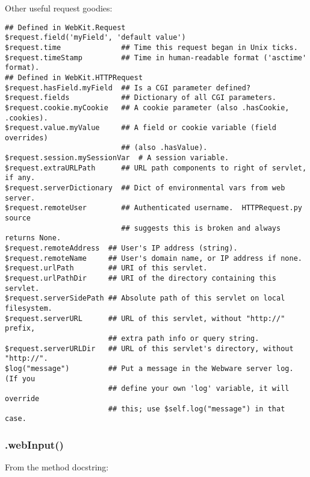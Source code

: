Other useful request goodies:
\begin{verbatim}
## Defined in WebKit.Request
$request.field('myField', 'default value')
$request.time              ## Time this request began in Unix ticks.
$request.timeStamp         ## Time in human-readable format ('asctime' format).
## Defined in WebKit.HTTPRequest
$request.hasField.myField  ## Is a CGI parameter defined?
$request.fields            ## Dictionary of all CGI parameters.
$request.cookie.myCookie   ## A cookie parameter (also .hasCookie, .cookies).
$request.value.myValue     ## A field or cookie variable (field overrides)
                           ## (also .hasValue).
$request.session.mySessionVar  # A session variable.
$request.extraURLPath      ## URL path components to right of servlet, if any.
$request.serverDictionary  ## Dict of environmental vars from web server.
$request.remoteUser        ## Authenticated username.  HTTPRequest.py source
                           ## suggests this is broken and always returns None.
$request.remoteAddress  ## User's IP address (string).
$request.remoteName     ## User's domain name, or IP address if none.
$request.urlPath        ## URI of this servlet.
$request.urlPathDir     ## URI of the directory containing this servlet.
$request.serverSidePath ## Absolute path of this servlet on local filesystem.
$request.serverURL      ## URL of this servlet, without "http://" prefix,
                        ## extra path info or query string.
$request.serverURLDir   ## URL of this servlet's directory, without "http://".
$log("message")         ## Put a message in the Webware server log.  (If you
                        ## define your own 'log' variable, it will override
                        ## this; use $self.log("message") in that case.
\end{verbatim}

\subsubsection{.webInput()}
\label{webware.webInput}

From the method docstring:

